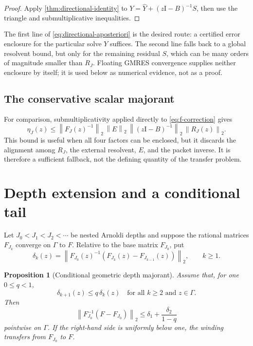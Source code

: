 \documentclass[11pt]{article}
\newtheorem{proposition}[theorem]{Proposition}
\theoremstyle{definition}
\theoremstyle{remark}
\newcommand{\Id}{\mathrm I}
\newcommand{\norm}[1]{\left\lVert#1\right\rVert}
\begin{document}
\begin{proof}
Apply \cref{thm:directional-identity} to
\(Y=\widehat Y+(z\Id-B)^{-1}S\), then use the triangle and
submultiplicative inequalities.
\end{proof}

The first line of \cref{eq:directional-aposteriori} is the desired route:
a certified error enclosure for the particular solve \(Y\) suffices.  The
second line falls back to a global resolvent bound, but only for the
remaining residual \(S\), which can be many orders of magnitude smaller
than \(R_J\).  Floating GMRES convergence supplies neither enclosure by
itself; it is used below as numerical evidence, not as a proof.

\subsection{The conservative scalar majorant}

For comparison, submultiplicativity applied directly to
\cref{eq:f-correction} gives
\begin{equation}
 \eta_J(z)\leq
 \norm{F_J(z)^{-1}}_2\,
 \norm{E}_2\,
 \norm{(z\Id-B)^{-1}}_2\,
 \norm{R_J(z)}_2.
 \label{eq:scalar-majorant}
\end{equation}
This bound is useful when all four factors can be enclosed, but it discards
the alignment among \(R_J\), the external resolvent, \(E\), and the packet
inverse.  It is therefore a sufficient fallback, not the defining quantity
of the transfer problem.

\section{Depth extension and a conditional tail}
\label{sec:depth-theory}

Let \(J_0<J_1<J_2<\cdots\) be nested Arnoldi depths and suppose the
rational matrices \(F_{J_k}\) converge on \(\Gamma\) to \(F\).  Relative
to the base matrix \(F_{J_0}\), put
\begin{equation}
 \delta_k(z)=
 \norm{F_{J_0}(z)^{-1}
 \left(F_{J_k}(z)-F_{J_{k-1}}(z)\right)}_2,
 \qquad k\geq1.
 \label{eq:depth-increments}
\end{equation}

\begin{proposition}[Conditional geometric depth majorant]
\label{prop:geometric-tail}
Assume that, for one \(0\leq q<1\),
\begin{equation}
 \delta_{k+1}(z)\leq q\,\delta_k(z)
 \quad\text{for all }k\geq2\text{ and }z\in\Gamma.
 \label{eq:geometric-hypothesis}
\end{equation}
Then
\begin{equation}
 \norm{F_{J_0}^{-1}(F-F_{J_0})}_2
 \leq \delta_1+\frac{\delta_2}{1-q}
 \label{eq:geometric-bound}
\end{equation}
pointwise on \(\Gamma\).  If the right-hand side is uniformly below one,
the winding transfers from \(F_{J_0}\) to \(F\).
\end{proposition}
\end{document}
